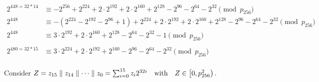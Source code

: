 \begin{align*}
2^{448=32*14} &\equiv - 2^{256} + 2^{224} + 2\cdot 2^{192} + 2\cdot 2^{160} + 2^{128} - 2^{96} - 2^{64} - 2^{32} \pmod{p_{256}} \\
2^{448} &\equiv - (2^{224} - 2^{192} - 2^{96} + 1) + 2^{224} + 2\cdot 2^{192} + 2\cdot 2^{160} + 2^{128} - 2^{96} - 2^{64} - 2^{32} \pmod{p_{256}} \\
2^{448} &\equiv 3\cdot 2^{192} + 2\cdot 2^{160} + 2^{128} - 2^{64} - 2^{32} - 1 \pmod{p_{256}} \\
\\
2^{480=32*15} &\equiv 3\cdot 2^{224} + 2\cdot 2^{192} + 2^{160} - 2^{96} - 2^{64} - 2^{32} \pmod{p_{256}} \\
\end{align*}

\newpage
\noindent Consider $
Z=z_{15}\adjacent z_{14}\adjacent\cdots\adjacent z_0=\sum_{i=0}^{15}z_i2^{32i}\quad\text{with}\quad Z\in\intco{0, p_{256}^2}.
$

